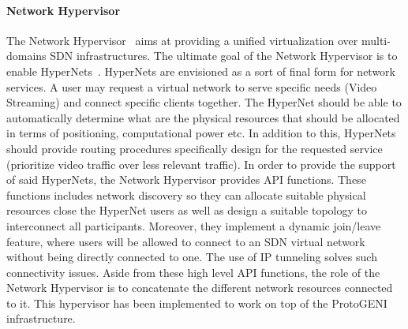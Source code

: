 \paragraph{Network Hypervisor}
The Network Hypervisor~\cite{NetworkHypervisor-Huang2013} aims at providing a unified virtualization over multi-domains SDN infrastructures. 
The ultimate goal of the Network Hypervisor is to enable HyperNets~\cite{HyperNet-Huang2013a}. HyperNets are envisioned as a sort of final form for network services. A user may request a virtual network to serve specific needs (\eg Video Streaming) and connect specific clients together.
The HyperNet should be able to automatically determine what are the physical resources that should be allocated in terms of positioning, computational power etc. In addition to this, HyperNets should provide routing procedures specifically design for the requested service (\ie prioritize video traffic over less relevant traffic).
In order to provide the support of said HyperNets, the Network Hypervisor provides API functions. These functions includes network discovery so they can allocate suitable physical resources close the HyperNet users as well as design a suitable topology to interconnect all participants.
Moreover, they implement a dynamic join/leave feature, where users will be allowed to connect to an SDN virtual network without being directly connected to one. The use of IP tunneling solves such connectivity issues.
Aside from these high level API functions, the role of the Network Hypervisor is to concatenate the different network resources connected to it.
This hypervisor has been implemented to work on top of the ProtoGENI~\cite{protoGENI} infrastructure.

